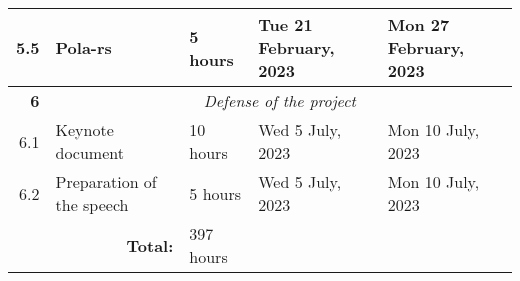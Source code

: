 \documentclass{standalone}
\begin{document}
\begin{tabular}{|r|llll|}
    5.5                                                           & \multicolumn{1}{l|}{Pola-rs}                                    & \multicolumn{1}{l|}{5 hours}                                   & \multicolumn{1}{l|}{Tue 21 February, 2023}                  & Mon 27 February, 2023                                        \\ \hline
    \textbf{6}                                                    & \multicolumn{4}{c|}{\textit{Defense of the project}}                                                                                                                                                                                                          \\ \hline
    6.1                                                           & \multicolumn{1}{l|}{Keynote document}                           & \multicolumn{1}{l|}{10 hours}                                  & \multicolumn{1}{l|}{Wed 5 July, 2023}                       & Mon 10 July, 2023                                            \\ \hline
    6.2                                                           & \multicolumn{1}{l|}{Preparation of the speech}                  & \multicolumn{1}{l|}{5 hours}                                   & \multicolumn{1}{l|}{Wed 5 July, 2023}                       & Mon 10 July, 2023                                            \\ \hline
    \multicolumn{2}{|r|}{\cellcolor[HTML]{C0C0C0}\textbf{Total:}} & \multicolumn{1}{l|}{397 hours}                                                                                                                                                                                                                                \\ \cline{1-3}
\end{tabular}
\end{document}
